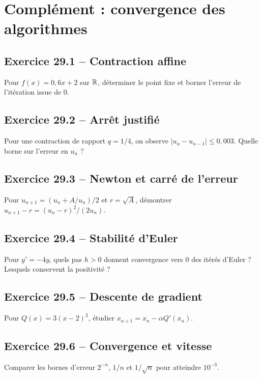 \chapter{Complément : convergence des algorithmes}
\section*{Exercice 29.1 -- Contraction affine}
Pour $f(x)=0{,}6x+2$ sur $\mathbb{R}$, déterminer le point fixe et borner l'erreur de l'itération issue de $0$.

\section*{Exercice 29.2 -- Arrêt justifié}
Pour une contraction de rapport $q=1/4$, on observe $|u_n-u_{n-1}|\le0{,}003$. Quelle borne sur l'erreur en $u_n$ ?

\section*{Exercice 29.3 -- Newton et carré de l'erreur}
Pour $u_{n+1}=(u_n+A/u_n)/2$ et $r=\sqrt A$, démontrer $u_{n+1}-r=(u_n-r)^2/(2u_n)$.

\section*{Exercice 29.4 -- Stabilité d'Euler}
Pour $y'=-4y$, quels pas $h>0$ donnent convergence vers $0$ des itérés d'Euler ? Lesquels conservent la positivité ?

\section*{Exercice 29.5 -- Descente de gradient}
Pour $Q(x)=3(x-2)^2$, étudier $x_{n+1}=x_n-\alpha Q'(x_n)$.

\section*{Exercice 29.6 -- Convergence et vitesse}
Comparer les bornes d'erreur $2^{-n}$, $1/n$ et $1/\sqrt n$ pour atteindre $10^{-3}$.
